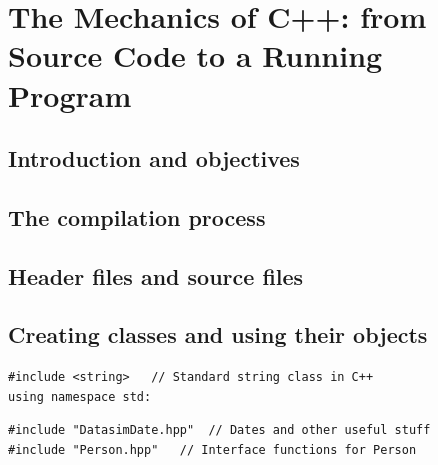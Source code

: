 \chapter{The Mechanics of C++: from Source Code to a Running Program}

\section{Introduction and objectives}

\section{The compilation process}

\section{Header files and source files}










\section{Creating classes and using their objects}

\begin{lstlisting}
#include <string>	// Standard string class in C++
using namespace std:
\end{lstlisting}

\begin{lstlisting}
#include "DatasimDate.hpp"	// Dates and other useful stuff
#include "Person.hpp"	// Interface functions for Person
\end{lstlisting}

